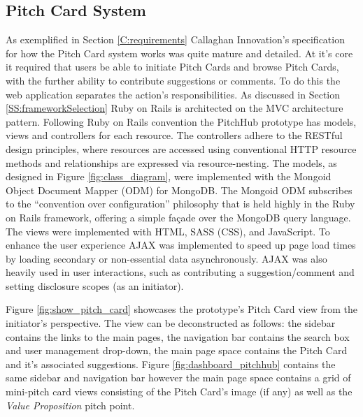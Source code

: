 \subsection{Pitch Card System}
As exemplified in Section \ref{C:requirements} Callaghan Innovation's specification for how the Pitch Card system works was quite mature and detailed. At it's core it required that users be able to initiate Pitch Cards and browse Pitch Cards, with the further ability to contribute suggestions or comments. To do this the web application separates the action's responsibilities. As discussed in Section \ref{SS:frameworkSelection} Ruby on Rails is architected on the MVC architecture pattern. Following Ruby on Rails convention the PitchHub prototype has models, views and controllers for each resource. The controllers adhere to the RESTful design principles, where resources are accessed using conventional HTTP resource methods and relationships are expressed via resource-nesting. The models, as designed in Figure \ref{fig:class_diagram}, were implemented with the Mongoid \cite{Mongo4:online} Object Document Mapper (ODM) for MongoDB. The Mongoid ODM subscribes to the ``convention over configuration'' philosophy that is held highly in the Ruby on Rails framework, offering a simple fa\c{c}ade over the MongoDB query language. The views were implemented with HTML, SASS (CSS), and JavaScript. To enhance the user experience AJAX was implemented to speed up page load times by loading secondary or non-essential data asynchronously. AJAX was also heavily used in user interactions, such as contributing a suggestion/comment and setting disclosure scopes (as an initiator).
\par
Figure \ref{fig:show_pitch_card} showcases the prototype's Pitch Card view from the initiator's perspective. The view can be deconstructed as follows: the sidebar contains the links to the main pages, the navigation bar contains the search box and user management drop-down, the main page space contains the Pitch Card and it's associated suggestions. Figure \ref{fig:dashboard_pitchhub} contains the same sidebar and navigation bar however the main page space contains a grid of mini-pitch card views consisting of the Pitch Card's image (if any) as well as the \textit{Value Proposition} pitch point.

